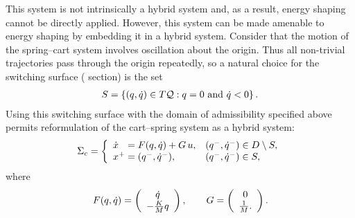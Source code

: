 This system is not intrinsically a hybrid system and, as a result, energy
shaping cannot be directly applied.
%
However, this system can be made amenable to energy shaping by embedding it
in a hybrid system.
%
Consider that the motion of the spring--cart system involves oscillation about
the origin.
%
Thus all non-trivial trajectories pass through the origin repeatedly, so a
natural choice for the switching surface (\Poincare{} section) is the set
\begin{align}
  S = \left\{ (q, \dot{q}) \in T\mathcal{Q} : q = 0 \mbox{ and } \dot{q} < 0 \right\}.
  \label{eq:cart_spring_guard}
\end{align}
%
Using this switching surface with the domain of admissibility specified above
permits reformulation of the cart--spring system as a hybrid system:
%
\begin{align}
  \Sigma_{c} = \left\{
  \begin{array}{l l}
    {\dot {x}}\hphantom{^+} = F(q, \dot{q}) + G \, u, & (q^{-}, \dot{q}^{-}) \in D \setminus
    S,\\
    x^{+} = (q^{-}, \dot{q}^{-}), & (q^{-}, \dot{q}^{-}) \in S,
  \end{array}\right.
\end{align}
where
\begin{align*}
  F(q, \dot{q}) = \left(\begin{array}{c}
      \dot{q}\\
      -\frac{K}{M} q
    \end{array}\right), \qquad
    G = \left(\begin{array}{c}
        0\\
        \frac{1}{M}.
      \end{array}\right).
\end{align*}

